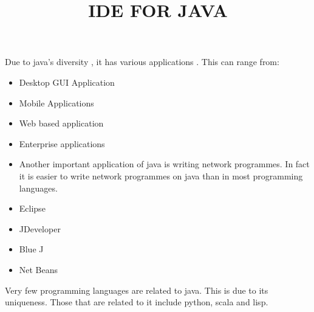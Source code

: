 \documentclass{article}
\begin{document}
	Due to java’s diversity , it has various applications . This can range from:
	
	\begin{itemize}
		\item Desktop GUI Application
		\item Mobile Applications
		\item Web based application
		\item Enterprise applications
		\item Another important application of java is writing network programmes. In fact it is easier to write network programmes on java than in most programming languages.
		
	\end{itemize}

\title{IDE FOR JAVA}

\maketitle

\begin{itemize}
\item Eclipse
\item JDeveloper
\item Blue J
\item Net Beans

\end{itemize}

Very few programming languages are related to java. This is due to its uniqueness. Those that are related to it include python, scala and lisp.
\end{document}
